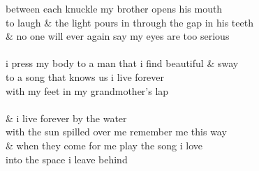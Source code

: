 \begin{Parallel}{0.48\textwidth}{0.48\textwidth}
{between each knuckle \indent my brother opens his mouth\\
to laugh \& the light pours in \indent through the gap in his teeth\\
\& no one will ever again say my eyes are too serious\\
\-\ \\ i press my body to a man that i find beautiful \indent \& sway\\
to a song that knows us \indent \indent i live forever\\
with my feet in my grandmother’s lap\\
\-\ \\\& \indent \indent  \indent \indent i live forever by the water\\
with the sun spilled over me \indent remember me this way\\
\& when they come for me \indent \indent play the song i love\\
into the space i leave behind}
\ParallelPar
\end{Parallel}